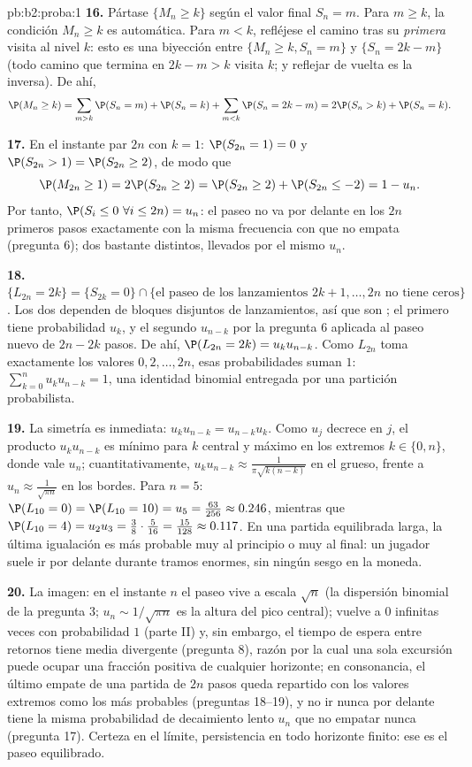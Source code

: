 \begin{solution}{pb:b2:proba:1}
\textbf{16.} Pártase $\{M_n \geq k\}$ según el valor final $S_n = m$.
Para $m \geq k$, la condición $M_n \geq k$ es automática. Para $m <
k$, refléjese el camino tras su \emph{primera} visita al nivel $k$:
esto es una biyección entre $\{M_n \geq k, S_n = m\}$ y $\{S_n = 2k -
m\}$ (todo camino que termina en $2k - m > k$ visita $k$; y reflejar
de vuelta es la inversa). De ahí,
\[
\P(M_n \geq k)
= \sum_{m > k}\P(S_n = m) + \P(S_n = k)
+ \sum_{m < k}\P(S_n = 2k - m)
= 2\P(S_n > k) + \P(S_n = k).
\]

\textbf{17.} En el instante par $2n$ con $k = 1$: $\P(S_{2n} = 1) =
0$ y $\P(S_{2n} > 1) = \P(S_{2n} \geq 2)$, de modo que
\[
\P(M_{2n} \geq 1) = 2\P(S_{2n} \geq 2)
= \P(S_{2n} \geq 2) + \P(S_{2n} \leq -2)
= 1 - u_n .
\]
Por tanto, $\P(S_i \leq 0\ \forall i \leq 2n) = u_n$: el paseo no va
por delante en los $2n$ primeros pasos exactamente con la misma
frecuencia con que no empata (pregunta 6); dos  bastante
distintos, llevados por el mismo $u_n$.

\textbf{18.} $\{L_{2n} = 2k\} = \{S_{2k} = 0\} \cap \{\text{el paseo
de los lanzamientos } 2k+1, \dots, 2n \text{ no tiene ceros}\}$. Los
dos  dependen de bloques disjuntos de lanzamientos, así que
son ; el primero tiene probabilidad $u_k$, y el
segundo $u_{n-k}$ por la pregunta 6 aplicada al paseo nuevo de $2n -
2k$ pasos. De ahí, $\P(L_{2n} = 2k) = u_ku_{n-k}$. Como $L_{2n}$ toma
exactamente los valores $0, 2, \dots, 2n$, esas probabilidades suman
$1$: $\sum_{k=0}^nu_ku_{n-k} = 1$, una identidad binomial entregada
por una partición probabilista.

\textbf{19.} La simetría es inmediata: $u_ku_{n-k} = u_{n-k}u_k$.
Como $u_j$ decrece en $j$, el producto $u_ku_{n-k}$ es mínimo para
$k$ central y máximo en los extremos $k \in \{0, n\}$, donde vale
$u_n$; cuantitativamente, $u_ku_{n-k} \approx
\frac1{\pi\sqrt{k(n-k)}}$ en el grueso, frente a $u_n \approx
\frac1{\sqrt{\pi n}}$ en los bordes. Para $n = 5$: $\P(L_{10} = 0) =
\P(L_{10} = 10) = u_5 = \frac{63}{256} \approx 0.246$, mientras que
$\P(L_{10} = 4) = u_2u_3 = \frac38\cdot\frac5{16} = \frac{15}{128}
\approx 0.117$. En una partida equilibrada larga, la última
igualación es más probable muy al principio o muy al final: un
jugador suele ir por delante durante tramos enormes, sin ningún sesgo
en la moneda.

\textbf{20.} La imagen: en el instante $n$ el paseo vive a escala
$\sqrt n$ (la dispersión binomial de la pregunta 3; $u_n \sim
1/\sqrt{\pi n}$ es la altura del pico central); vuelve a $0$
infinitas veces con probabilidad $1$ (parte II) y, sin embargo, el
tiempo de espera entre retornos tiene media divergente (pregunta 8),
razón por la cual una sola excursión puede ocupar una fracción
positiva de cualquier horizonte; en consonancia, el último empate de
una partida de $2n$ pasos queda repartido con los valores extremos
como los más probables (preguntas 18--19), y no ir nunca por delante
tiene la misma probabilidad de decaimiento lento $u_n$ que no empatar
nunca (pregunta 17). Certeza en el límite, persistencia en todo
horizonte finito: ese es el paseo equilibrado.


\end{solution}
